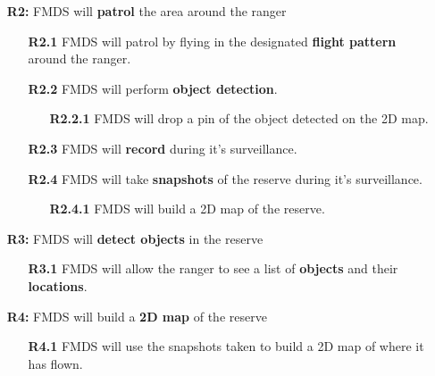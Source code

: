 \begin{itemize}
    \item [\textbf{R2:}] FMDS will \textbf{patrol} the area around the ranger
    
    \begin{itemize}
        \item [\textbf{R2.1}] FMDS will patrol by flying in the designated \textbf{flight pattern} around the ranger.
        \item [\textbf{R2.2}] FMDS will perform \textbf{object detection}.
            \begin{itemize}
                \item [\textbf{R2.2.1}] FMDS will drop a pin of the object detected on the 2D map.
            \end{itemize}
        \item [\textbf{R2.3}] FMDS will \textbf{record} during it's surveillance.
        \item [\textbf{R2.4}] FMDS will take \textbf{snapshots} of the reserve during it's surveillance.
            \begin{itemize}
                \item [\textbf{R2.4.1}] FMDS will build a 2D map of the reserve.
            \end{itemize}
    \end{itemize}
\end{itemize}

\begin{itemize}
    \item  [\textbf{R3:}] FMDS will \textbf{detect objects} in the reserve

    \begin{itemize}
        \item  [\textbf{R3.1}] FMDS will allow the ranger to see a list of \textbf{objects} and their \textbf{locations}.
    \end{itemize}
\end{itemize}

\begin{itemize}
    \item  [\textbf{R4:}] FMDS will build a \textbf{2D map} of the reserve

    \begin{itemize}
        \item  [\textbf{R4.1}] FMDS will use the snapshots taken to build a 2D map of where it has flown.
    \end{itemize}
\end{itemize}




